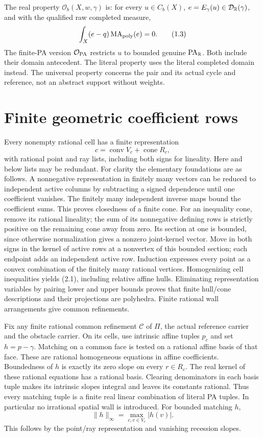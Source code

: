 \documentclass[11pt]{article}
\newcommand{\R}{\mathbb R}\newcommand{\Q}{\mathbb Q}\newcommand{\Z}{\mathbb Z}
\newcommand{\MA}{\operatorname{MA}_{\rm poly}}\newcommand{\rec}{\operatorname{rec}}
\newcommand{\conv}{\operatorname{conv}}\newcommand{\cone}{\operatorname{cone}}
\begin{document}
The real property $\mathcal O_b(X,w,\gamma)$ is: for every $u\in C_b(X)$, $e=E_\gamma(u)\in\D$, and with the qualified raw completed measure,
\[
       \int_X(e-q)\MA(e)=0.                                          \tag{1.3}
\]
The finite-PA version $\mathcal O_{\rm PA}$ restricts $u$ to bounded genuine $\PA_\R$. Both include their domain antecedent. The literal property uses the literal completed domain instead. The universal property concerns the pair and its actual cycle and reference, not an abstract support without weights.

\section{Finite geometric coefficient rows}
Every nonempty rational cell has a finite representation
\[
 c=\conv V_c+\cone R_c,                                               \tag{2.1}
\]
with rational point and ray lists, including both signs for lineality. Here and below lists may be redundant. For clarity the elementary foundations are as follows. A nonnegative representation in finitely many vectors can be reduced to independent active columns by subtracting a signed dependence until one coefficient vanishes. The finitely many independent inverse maps bound the coefficient sums. This proves closedness of a finite cone. For an inequality cone, remove its rational lineality; the sum of its nonnegative defining rows is strictly positive on the remaining cone away from zero. Its section at one is bounded, since otherwise normalization gives a nonzero joint-kernel vector. Move in both signs in the kernel of active rows at a nonvertex of this bounded section; each endpoint adds an independent active row. Induction expresses every point as a convex combination of the finitely many rational vertices. Homogenizing cell inequalities yields (2.1), including relative affine hulls. Eliminating representation variables by pairing lower and upper bounds proves that finite hull/cone descriptions and their projections are polyhedra. Finite rational wall arrangements give common refinements.

Fix any finite rational common refinement $\mathcal C$ of $\Pi$, the actual reference carrier and the obstacle carrier. On its cells, use intrinsic affine tuples $p_c$ and set $h=p-\gamma$. Matching on a common face is tested on a rational affine basis of that face. These are rational homogeneous equations in affine coefficients. Boundedness of $h$ is exactly its zero slope on every $r\in R_c$. The real kernel of these rational equations has a rational basis. Clearing denominators in each basis tuple makes its intrinsic slopes integral and leaves its constants rational. Thus every matching tuple is a finite real linear combination of literal PA tuples. In particular no irrational spatial wall is introduced. For bounded matching $h$,
\[
       \|h\|_\infty=\max_{c,v\in V_c}|h(v)|.                         \tag{2.2}
\]
This follows by the point/ray representation and vanishing recession slopes.
\end{document}
